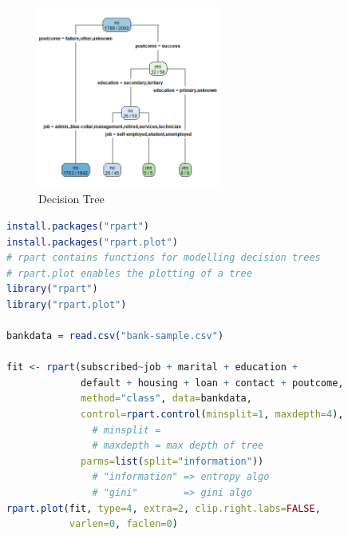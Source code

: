 \documentclass{article}
\begin{document}
\begin{figure}[H]
    \centering
    \includegraphics[width=6cm]{images/bankdata.png}
    \caption{Decision Tree}
\end{figure}

\begin{lstlisting}[language=R]
install.packages("rpart")
install.packages("rpart.plot")
# rpart contains functions for modelling decision trees
# rpart.plot enables the plotting of a tree
library("rpart")
library("rpart.plot")

bankdata = read.csv("bank-sample.csv")

fit <- rpart(subscribed~job + marital + education + 
             default + housing + loan + contact + poutcome,
             method="class", data=bankdata,
             control=rpart.control(minsplit=1, maxdepth=4),
               # minsplit =
               # maxdepth = max depth of tree
             parms=list(split="information"))
               # "information" => entropy algo
               # "gini"        => gini algo
rpart.plot(fit, type=4, extra=2, clip.right.labs=FALSE,
           varlen=0, faclen=0)
\end{lstlisting}
\end{document}
